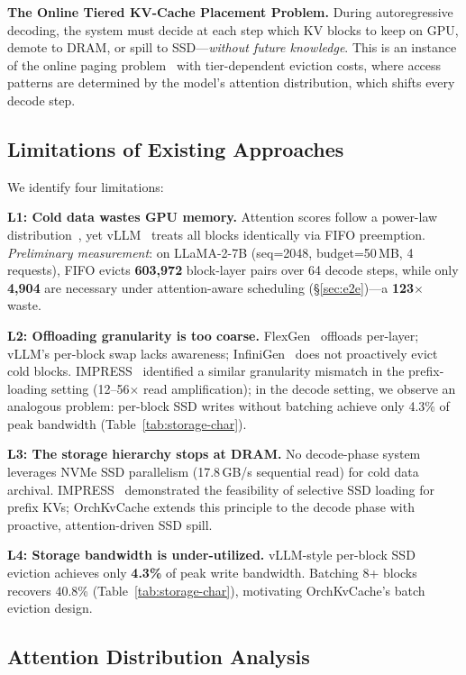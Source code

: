 \documentclass[conference]{IEEEtran}
\begin{document}
\textbf{The Online Tiered KV-Cache Placement Problem.} During autoregressive decoding, the system must decide at each step which KV blocks to keep on GPU, demote to DRAM, or spill to SSD---\emph{without future knowledge}. This is an instance of the online paging problem~\cite{sleator-tarjan} with tier-dependent eviction costs, where access patterns are determined by the model's attention distribution, which shifts every decode step.

\subsection{Limitations of Existing Approaches}

We identify four limitations:

\textbf{L1: Cold data wastes GPU memory.} Attention scores follow a power-law distribution~\cite{h2o,scissorhands}, yet vLLM~\cite{vllm} treats all blocks identically via FIFO preemption. \emph{Preliminary measurement}: on LLaMA-2-7B (seq=2048, budget=50\,MB, 4 requests), FIFO evicts \textbf{603{,}972} block-layer pairs over 64 decode steps, while only \textbf{4{,}904} are necessary under attention-aware scheduling (\S\ref{sec:e2e})---a \textbf{123$\times$} waste.

\textbf{L2: Offloading granularity is too coarse.} FlexGen~\cite{flexgen} offloads per-layer; vLLM's per-block swap lacks awareness; InfiniGen~\cite{infinigen} does not proactively evict cold blocks.  IMPRESS~\cite{impress} identified a similar granularity mismatch in the prefix-loading setting (12--56$\times$ read amplification); in the decode setting, we observe an analogous problem: per-block SSD writes without batching achieve only 4.3\% of peak bandwidth (Table~\ref{tab:storage-char}).

\textbf{L3: The storage hierarchy stops at DRAM.} No decode-phase system leverages NVMe SSD parallelism (17.8\,GB/s sequential read) for cold data archival.  IMPRESS~\cite{impress} demonstrated the feasibility of selective SSD loading for prefix KVs; OrchKvCache extends this principle to the decode phase with proactive, attention-driven SSD spill.

\textbf{L4: Storage bandwidth is under-utilized.} vLLM-style per-block SSD eviction achieves only \textbf{4.3\%} of peak write bandwidth. Batching 8+ blocks recovers 40.8\% (Table~\ref{tab:storage-char}), motivating OrchKvCache's batch eviction design.

\subsection{Attention Distribution Analysis}
\end{document}
